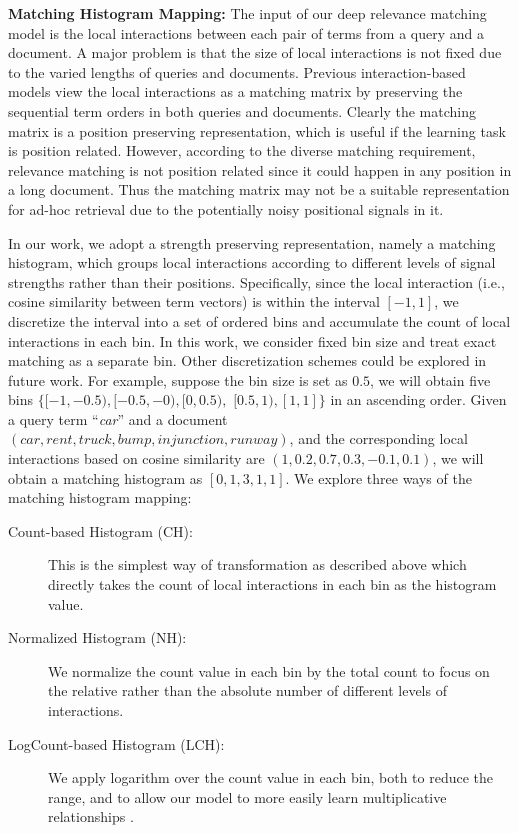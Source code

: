 \documentclass{sig-alternate-05-2015}
\begin{document}
\textbf{Matching Histogram Mapping:} The input of our deep relevance matching model is the local interactions between each pair of terms from a query and a document. A major problem is that the size of local interactions is not fixed due to the varied lengths of queries and documents.
Previous interaction-based models view the local interactions as a matching matrix by preserving the sequential term orders in both queries and documents. Clearly the matching matrix is a position preserving representation, which is useful if the learning task is position related. However, according to the diverse matching requirement, relevance matching is not position related since it could happen in any position in a long document. Thus the matching matrix may not be a suitable representation for ad-hoc retrieval due to the potentially noisy positional signals in it.


In our work, we adopt a strength preserving representation, namely a matching histogram, which groups local interactions according to different levels of signal strengths rather than their positions. Specifically, since the local interaction (i.e., cosine similarity between term vectors) is within the interval $[-1,1]$, we discretize the interval into a set of ordered bins and accumulate the count of local interactions in each bin. In this work, we consider fixed bin size and treat exact matching as a separate bin. Other discretization schemes could be explored in future work. For example, suppose the bin size is set as $0.5$, we will obtain five bins $\{[-1,-0.5), [-0.5,-0), [0,0.5),$ $[0.5,1), [1,1]\}$ in an ascending order. Given a query term ``\textit{car}'' and a document $(car, rent, truck, bump, injunction, runway)$, and the corresponding local interactions based on cosine similarity are $(1, 0.2, 0.7, 0.3, -0.1, 0.1)$, we will obtain a matching histogram as $[0, 1, 3, 1, 1]$.
We explore three ways of the matching histogram mapping:
\begin{description}
\item[Count-based Histogram (CH):] This is the simplest way of transformation as described above which directly takes the count of local interactions in each bin as the histogram value.
\item[Normalized Histogram (NH):] We normalize the count value in each bin by the total count to focus on the relative rather than the absolute number of different levels of interactions.
\item[LogCount-based Histogram (LCH):] We apply logarithm over the count value in each bin, both to reduce the range, and to allow our model to more easily learn multiplicative relationships \cite{burges2005learning}.
\end{description}
\end{document}
